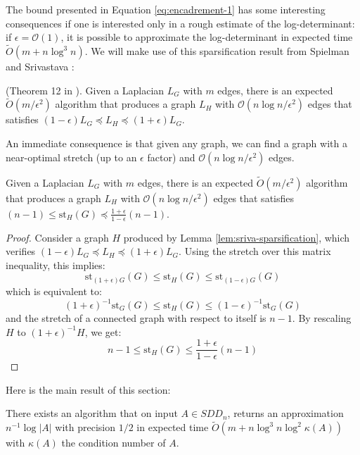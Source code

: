 The bound presented in Equation \ref{eq:encadrement-1} has some interesting
consequences if one is interested only in a rough estimate of the
log-determinant: if $\epsilon=\mathcal{O}\left(1\right)$, it is possible
to approximate the log-determinant in expected time $\tilde{O}\left(m+n\log^{3}n\right)$.
We will make use of this sparsification result from Spielman and Srivastava
\cite{Spielman2009}: 
\begin{lemma}
\label{lem:sriva-sparsification}(Theorem 12 in \cite{Spielman2009}).
Given a Laplacian $L_{G}$ with $m$ edges, there is an expected $\tilde{O}\left(m/\epsilon^{2}\right)$
algorithm that produces a graph $L_{H}$ with $\mathcal{O}\left(n\log n/\epsilon^{2}\right)$
edges that satisfies $\left(1-\epsilon\right)L_{G}\preceq L_{H}\preceq\left(1+\epsilon\right)L_{G}$. 
\end{lemma}
An immediate consequence is that given any graph, we can find a graph
with a near-optimal stretch (up to an $\epsilon$ factor) and $\mathcal{O}\left(n\log n/\epsilon^{2}\right)$
edges. 
\begin{lemma}
\label{lem:low-stretch-bounding}Given a Laplacian $L_{G}$ with $m$
edges, there is an expected $\tilde{O}\left(m/\epsilon^{2}\right)$
algorithm that produces a graph $L_{H}$ with $\mathcal{O}\left(n\log n/\epsilon^{2}\right)$
edges that satisfies $\left(n-1\right)\leq\text{st}_{H}\left(G\right)\preceq\frac{1+\epsilon}{1-\epsilon}\left(n-1\right)$.\end{lemma}
\begin{proof}
Consider a graph $H$ produced by Lemma \ref{lem:sriva-sparsification},
which verifies $\left(1-\epsilon\right)L_{G}\preceq L_{H}\preceq\left(1+\epsilon\right)L_{G}$.
Using the stretch over this matrix inequality, this implies: 
\[
\text{st}_{\left(1+\epsilon\right)G}\left(G\right)\leq\text{st}_{H}\left(G\right)\leq\text{st}_{\left(1-\epsilon\right)G}\left(G\right)
\]
which is equivalent to: 
\[
\left(1+\epsilon\right)^{-1}\text{st}_{G}\left(G\right)\leq\text{st}_{H}\left(G\right)\leq\left(1-\epsilon\right)^{-1}\text{st}_{G}\left(G\right)
\]
and the stretch of a connected graph with respect to itself is $n-1$.
By rescaling $H$ to $\left(1+\epsilon\right)^{-1}H$, we get: 
\[
n-1\leq\text{st}_{H}\left(G\right)\leq\frac{1+\epsilon}{1-\epsilon}\left(n-1\right)
\]

\end{proof}
Here is the main result of this section: 
\begin{proposition}
There exists an algorithm that on input $A\in SDD_{n}$, returns an
approximation $n^{-1}\log\left|A\right|$ with precision $1/2$ in
expected time \linebreak $\tilde{O}\left(m+n\log^{3}n\log^{2}\kappa(A)\right)$
with $\kappa(A)$ the condition number of $A$.\end{proposition}
